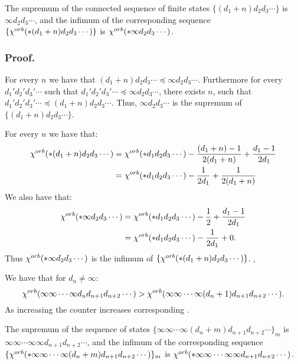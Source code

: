 \begin{lemma}\label{chi supp functoriality}
The supremum of the connected sequence 
of finite states $\{(d_1+n)d_2d_3\cdots\}$ is $\infty d_2d_3\cdots$, and 
the infimum of the corresponding sequence $\{{\chi^{orb}(*(d_1+n)d_2d_3\cdots)}\}$ is  
${\chi^{orb}(*\infty d_2d_3\cdots)}$.
\end{lemma}
\subsubsection{Proof.} \label{chi supp functoriality proof}

For every $n$ we have that $(d_1+n)d_2d_3\cdots\preceq\infty d_2d_3\cdots$. Furthermore for 
every $d_1'd_2'd_3'\cdots$ such that $d_1'd_2'd_3'\cdots\preceq \infty d_2d_3\cdots$, there 
exists $n$, such that $d_1'd_2'd_3' \cdots\preceq(d_1+n)d_2d_3\cdots$. Thus, $\infty d_2d_3\cdots$ 
is the supremum of $\{(d_1+n)d_2d_3\cdots\}$.

For every $n$ we have that: 
\begin{align}
{\chi^{orb}(*(d_1+n)d_2d_3\cdots)} &= {\chi^{orb}(*d_1d_2d_3\cdots)} 
- \frac{(d_1+n)-1}{2(d_1+n)} + \frac{d_1-1}{2d_1} \notag\\ 
&= {\chi^{orb}(*d_1d_2d_3\cdots)} - \frac{1}{2d_1} + \frac{1}{2(d_1+n)}
\end{align}
We also have that:
\begin{align}
{\chi^{orb}(*\infty d_2d_3\cdots)} &= {\chi^{orb}(*d_1d_2d_3\cdots)} 
- \frac{1}{2} + \frac{d_1-1}{2d_1} \notag\\ 
&= {\chi^{orb}(*d_1d_2d_3\cdots)} - \frac{1}{2d_1} + 0.
\end{align}
Thus ${\chi^{orb}(*\infty d_2d_3\cdots)}$ is the infimum of $\{{\chi^{orb}(*(d_1+n)d_2d_3\cdots)}\}$.
$_\square$
\begin{observation}
We have that for $d_n \neq \infty$:
\begin{equation}
{\chi^{orb}(\infty\infty\cdots\infty d_n d_{n+1} d_{n+2}\cdots)} > 
{\chi^{orb}(\infty\infty\cdots\infty (d_n+1) d_{n+1} d_{n+2}\cdots)}. 
\end{equation}
As increasing the counter increases corresponding \Eoc.
\end{observation}
\begin{lemma}\label{chi supp functoriality non finite}
The supremum of the sequence 
of states $\{\infty\infty\cdots\infty (d_n+m) d_{n+1} d_{n+2}\cdots\}_m$ 
is $\infty\infty\cdots\infty \infty d_{n+1} d_{n+2}\cdots$, and 
the infimum of the corresponding sequence 
$\{{\chi^{orb}(*\infty\infty\cdots\infty (d_n+m) d_{n+1} d_{n+2}\cdots)}\}_m$ is  
${\chi^{orb}(*\infty\infty\cdots\infty \infty d_{n+1} d_{n+2}\cdots)}$.
\end{lemma}
